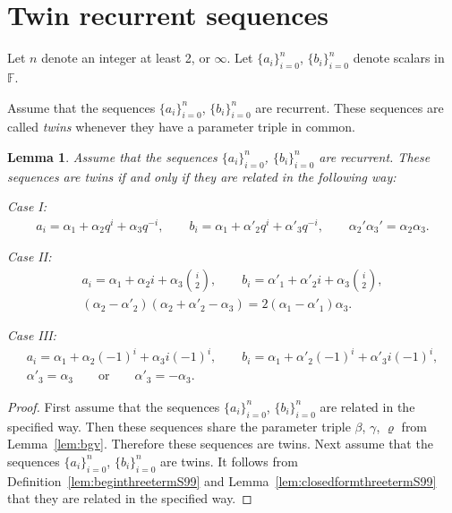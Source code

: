 \documentclass[pdftex]{sigma}
\numberwithin{equation}{section}
\newtheorem{Lemma}[Theorem]{Lemma}
\begin{document}
\section{Twin recurrent sequences}\label{section10}

Let $n$ denote an integer at least 2, or $\infty$.
Let $\lbrace a_i\rbrace_{i=0}^n$, $\lbrace b_i\rbrace_{i=0}^n$ denote scalars in~$\mathbb F$.

\begin{Definition}\label{def:twin}
Assume that the sequences
$\lbrace a_i\rbrace_{i=0}^n$,
$\lbrace b_i\rbrace_{i=0}^n$ are recurrent.
These sequences are called {\it twins}
whenever they have a parameter triple in common.
\end{Definition}

\begin{Lemma}\label{lem:twin}
 Assume that the sequences $\lbrace a_i\rbrace_{i=0}^n$,
$\lbrace b_i\rbrace_{i=0}^n$ are recurrent.
These sequences are twins if and only if
they are related in the following way:

Case I:
\begin{gather*}
 a_i= \alpha_1 + \alpha_2 q^i + \alpha_3 q^{-i},
\qquad
 b_i= \alpha_1 + \alpha'_2 q^i + \alpha'_3 q^{-i},
\qquad
 \alpha_2' \alpha_3' = \alpha_2 \alpha_3.
\end{gather*}

Case II:
\begin{gather*}
 a_i= \alpha_1 + \alpha_2 i + \alpha_3 \binom{i}{2},
\qquad
 b_i= \alpha'_1 + \alpha'_2 i + \alpha_3 \binom{i}{2},
\\
(\alpha_2-\alpha'_2)(\alpha_2+\alpha'_2-\alpha_3)=
2(\alpha_1-\alpha'_1)\alpha_3.
\end{gather*}

Case III:
\begin{gather*}
 a_i= \alpha_1 + \alpha_2 (-1)^i + \alpha_3 i(-1)^i,\qquad
 b_i= \alpha_1 + \alpha'_2 (-1)^i + \alpha'_3 i(-1)^i,\\
\alpha'_3= \alpha_3 \qquad \text{or} \qquad \alpha'_3=-\alpha_3 .
\end{gather*}
\end{Lemma}
\begin{proof}
First assume that the sequences $\lbrace a_i \rbrace_{i=0}^n$,
 $\lbrace b_i \rbrace_{i=0}^n$ are related in the specified way.
Then these sequences share the parameter triple
$\beta$, $\gamma$, $\varrho$ from
Lemma~\ref{lem:bgv}. Therefore these sequences are twins.
Next assume that the sequences
 $\lbrace a_i \rbrace_{i=0}^n$,
 $\lbrace b_i \rbrace_{i=0}^n$ are twins.
It follows from Definition~\ref{lem:beginthreetermS99}
and Lemma~\ref{lem:closedformthreetermS99}
that they are related in the specified way.
\end{proof}
\end{document}
